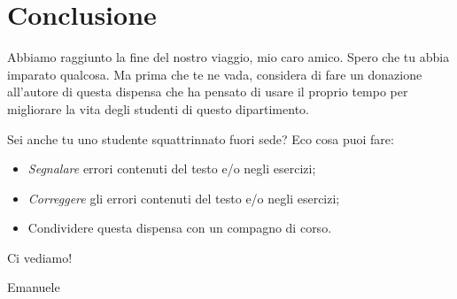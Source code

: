 \section*{Conclusione}

Abbiamo raggiunto la fine del nostro viaggio, mio caro amico. Spero che tu abbia imparato qualcosa. Ma prima che te ne vada, considera di fare un donazione all'autore di questa dispensa che ha pensato di usare il proprio tempo per migliorare la vita degli studenti di questo dipartimento.

Sei anche tu uno studente squattrinnato fuori sede? Eco cosa puoi fare:

\begin{itemize}
	\item \emph{Segnalare} errori contenuti del testo e/o negli esercizi;
	\item \emph{Correggere} gli errori contenuti del testo e/o negli esercizi;
	\item Condividere questa dispensa con un compagno di corso.
\end{itemize}

Ci vediamo!

Emanuele
